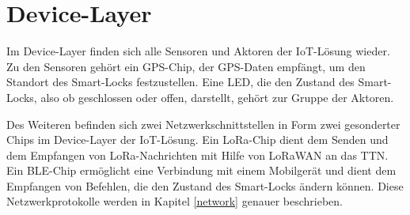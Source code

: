 
\section{Device-Layer}

Im Device-Layer finden sich alle Sensoren und Aktoren der \ac{IoT}-Lösung wieder. 
Zu den Sensoren gehört ein \ac{GPS}-Chip, der \ac{GPS}-Daten empfängt, um den Standort des Smart-Locks festzustellen. Eine \ac{LED}, die den Zustand des Smart-Locks, also ob geschlossen 
oder offen, darstellt, gehört zur Gruppe der Aktoren.

Des Weiteren befinden sich zwei Netzwerkschnittstellen in Form zwei gesonderter Chips im Device-Layer der \ac{IoT}-Lösung. Ein \ac{LoRa}-Chip dient dem Senden und dem Empfangen von 
\ac{LoRa}-Nachrichten mit Hilfe von \ac{LoRaWAN} an das \ac{TTN}. Ein \ac{BLE}-Chip ermöglicht eine Verbindung mit einem Mobilgerät und dient dem Empfangen von Befehlen, 
die den Zustand des Smart-Locks ändern können. Diese Netzwerkprotokolle werden in Kapitel \ref{network} genauer beschrieben.